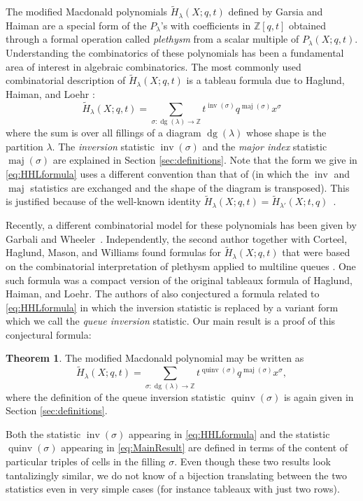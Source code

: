 \documentclass[11pt]{article}
\theoremstyle{definition}
\numberwithin{equation}{section}
\DeclareMathOperator{\dg}{dg}
\DeclareMathOperator{\maj}{maj}
\DeclareMathOperator{\inv}{inv}
\DeclareMathOperator{\quinv}{quinv}
\newtheorem*{thm*}{Theorem}
\begin{document}
The modified Macdonald polynomials $\widetilde{H}_{\lambda}(X;q,t)$ defined by Garsia and Haiman \cite{garsia-haiman-1993} are a special form of the $P_{\lambda}$'s with coefficients in $\mathbb{Z}[q,t]$ obtained through a formal operation called \emph{plethysm} from a scalar multiple of $P_{\lambda}(X;q,t)$. Understanding the combinatorics of these polynomials has been a fundamental area of interest in algebraic combinatorics. The most commonly used combinatorial description of $\widetilde{H}_{\lambda}(X;q,t)$ is a tableau formula due to Haglund, Haiman, and Loehr \cite{HHL05}:
\begin{equation}
\label{eq:HHLformula}
\widetilde{H}_{\lambda}(X;q,t) = \sum_{\sigma:\dg(\lambda) \rightarrow \mathbb{Z}} t^{\inv(\sigma)}q^{\maj(\sigma)}x^{\sigma}
\end{equation}
where the sum is over all fillings of a diagram $\dg(\lambda)$ whose shape is the partition $\lambda$. The \emph{inversion} statistic $\inv(\sigma)$ and the \emph{major index} statistic $\maj(\sigma)$ are explained in Section \ref{sec:definitions}. Note that the form we give in \eqref{eq:HHLformula} uses a different convention than that of \cite{HHL05} (in which the $\inv$ and $\maj$ statistics are exchanged and the shape of the diagram is transposed). This is justified because of the well-known identity $\widetilde{H}_{\lambda}(X;q,t) = \widetilde{H}_{\lambda'}(X;t,q)$~\cite[Prop. 2.6]{Hai99}. 



Recently, a different combinatorial model for these polynomials has been given by Garbali and Wheeler~\cite{garbali-wheeler-2020}. Independently, the second author together with Corteel, Haglund, Mason, and Williams found formulas for $\widetilde{H}_{\lambda}(X;q,t)$ that were based on the combinatorial interpretation of plethysm applied to multiline queues \cite{compactformula}. One such formula was a compact version of the original tableaux formula of Haglund, Haiman, and Loehr. The authors of \cite{compactformula} also conjectured a formula related
to \eqref{eq:HHLformula} in which the inversion statistic is replaced by a variant
form which we call the \emph{queue inversion} statistic.
Our main result  is a proof of this conjectural formula:
\begin{thm*}
The modified Macdonald polynomial may be written as
\begin{equation}\label{eq:MainResult}
\widetilde{H}_{\lambda}(X;q,t) = \sum_{\sigma:\dg(\lambda) \rightarrow \mathbb{Z}} t^{\quinv(\sigma)}q^{\maj(\sigma)}x^{\sigma},
\end{equation}
where the definition of the queue inversion statistic $\quinv(\sigma)$ is 
again given in Section \ref{sec:definitions}.
\end{thm*}
Both the statistic $\inv(\sigma)$ appearing in \eqref{eq:HHLformula}
and the statistic $\quinv(\sigma)$ appearing in \eqref{eq:MainResult}
are defined in terms of the content of particular triples of cells in the filling $\sigma$. 
Even though these two results look tantalizingly similar, we do 
not know of a bijection translating between the two statistics even in very simple 
cases (for instance tableaux with just two rows). 
\end{document}
